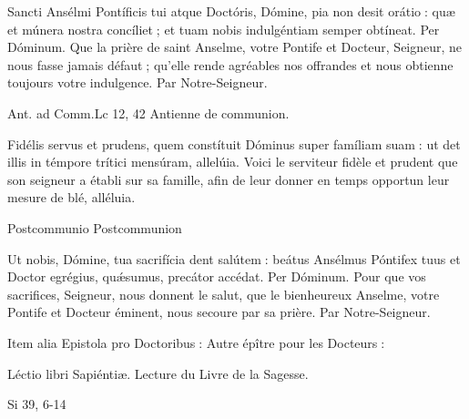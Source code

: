 \begin{paracol}{2}
Sancti Ansélmi Pontíficis tui atque  Doctóris, Dómine, pia non desit orátio : quæ et múnera nostra concíliet ; et tuam nobis indulgéntiam semper obtíneat. Per Dóminum.
\switchcolumn
Que la prière de saint Anselme, votre  Pontife et Docteur, Seigneur, ne nous fasse jamais défaut ; qu’elle rende agréables nos offrandes et nous obtienne toujours votre indulgence. Par Notre-Seigneur.
\switchcolumn*

Ant. ad Comm.\hfill Lc 12, 42
\switchcolumn
Antienne de communion.
\switchcolumn*

Fidélis servus et prudens, quem constítuit Dóminus super famíliam suam : ut det illis in témpore trítici mensúram, allelúia.
\switchcolumn
Voici le serviteur fidèle et prudent que son seigneur a établi sur sa famille, afin de leur donner en temps opportun leur mesure de blé, alléluia.
\switchcolumn*

Postcommunio
\switchcolumn
Postcommunion
\switchcolumn*

Ut nobis, Dómine, tua sacrifícia  dent salútem : beátus Ansélmus Póntifex tuus et Doctor egrégius, quǽsumus, precátor accédat. Per Dóminum.
\switchcolumn
Pour que vos sacrifices, Seigneur, nous  donnent le salut, que le bienheureux Anselme, votre Pontife et Docteur éminent, nous secoure par sa prière. Par Notre-Seigneur.
\switchcolumn*

Item alia Epistola pro Doctoribus :
\switchcolumn
Autre épître pour les Docteurs :
\switchcolumn*

Léctio libri Sapiéntiæ.
\switchcolumn
Lecture du Livre de la Sagesse.
\switchcolumn*

Si 39, 6-14
\switchcolumn

\switchcolumn*


\end{paracol}
